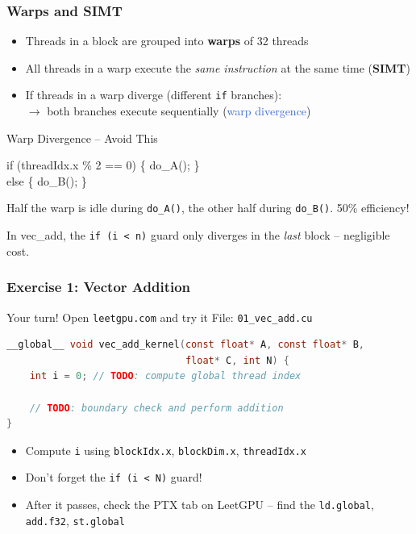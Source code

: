 \documentclass[aspectratio=169]{beamer}
\begin{document}
\begin{frame}
	\frametitle{Warps and SIMT}
	\begin{itemize}
		\item Threads in a block are grouped into \textbf{warps} of 32 threads
		\item All threads in a warp execute the \textit{same instruction} at the same time (\textbf{SIMT})
		\item If threads in a warp diverge (different \texttt{if} branches): \\
		      $\rightarrow$ both branches execute sequentially (\textcolor{highlight}{warp divergence})
	\end{itemize}
	\vspace{0.5em}
	\begin{alertblock}{Warp Divergence -- Avoid This}
		\begin{ttfamily}\scriptsize
			if (threadIdx.x \% 2 == 0) \{ do\_A(); \} \\
			else \{ do\_B(); \}
		\end{ttfamily}
		\vspace{0.3em}

		Half the warp is idle during \texttt{do\_A()}, the other half during \texttt{do\_B()}. 50\% efficiency!
	\end{alertblock}
	\vspace{0.3em}
	In vec\_add, the \texttt{if (i < n)} guard only diverges in the \textit{last} block -- negligible cost.
\end{frame}

\begin{frame}[fragile]
	\frametitle{Exercise 1: Vector Addition}
	\begin{block}{Your turn! Open \texttt{leetgpu.com} and try it}
		File: \texttt{01\_vec\_add.cu}
	\end{block}
	\vspace{0.3em}
	\begin{lstlisting}[language=C]
__global__ void vec_add_kernel(const float* A, const float* B,
                               float* C, int N) {
    int i = 0; // TODO: compute global thread index

    // TODO: boundary check and perform addition
}
	\end{lstlisting}
	\vspace{0.3em}
	\begin{itemize}
		\item Compute \texttt{i} using \texttt{blockIdx.x}, \texttt{blockDim.x}, \texttt{threadIdx.x}
		\item Don't forget the \texttt{if (i < N)} guard!
		\item After it passes, check the PTX tab on LeetGPU -- find the \texttt{ld.global}, \texttt{add.f32}, \texttt{st.global}
	\end{itemize}
\end{frame}
\end{document}
